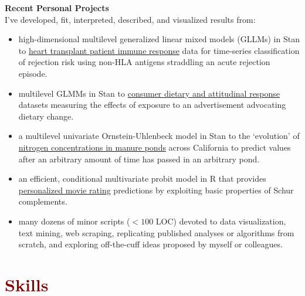 \documentclass[11pt,margin,line]{resume}
\begin{document}
\begin{resume}
\textbf{Recent Personal Projects}\\
I've developed, fit, interpreted, described, and visualized results from:
\begin{itemize}[noitemsep]
\item high-dimensional multilevel generalized linear mixed models (GLLMs) in Stan to \ul{heart transplant patient immune response} data for time-series classification of rejection risk using non-HLA antigens straddling an acute rejection episode.
\item multilevel GLMMs in Stan to \ul{consumer dietary and attitudinal response} datasets measuring the effects of exposure to an advertisement advocating dietary change.
\item a multilevel univariate Ornstein-Uhlenbeck model in Stan to the `evolution' of \ul{nitrogen concentrations in manure ponds} across California to predict values after an arbitrary amount of time has passed in an arbitrary pond.
\item an efficient, conditional multivariate probit model in R that provides \ul{personalized movie rating} predictions by exploiting basic properties of Schur complements.
\item many dozens of minor scripts ($<100$ LOC) devoted to data visualization, text mining, web scraping, replicating published analyses or algorithms from scratch, and exploring off-the-cuff ideas proposed by myself or colleagues.
\end{itemize}
\vspace{-1.5mm}

\section{\large\textcolor{DarkRed}{Skills}}

\begin{comment}
\textbf{Technical}: Generalized Linear Regression Analysis (e.g. Gaussian process, spline, poisson, logistic, robust, probit), PCA, Missing Data Imputation / Marginalization, Measurement Error Modeling, Stochastic Processes (e.g. CTMC / DTMC, birth-death, multivariate diffusion), Random Forests, Support Vector Machines, Neural Networks, Natural Language Processing, Expectation-Maximization, Model comparison (e.g. x-validation, information theoretic, marginal likelihood-based methods), Monte Carlo Methods, Clustering, Parallel \& Distributed Computing

\textbf{Other}: Science Communication, Teaching, Project Management, Hitchhiking, Public Speaking, Backpacking, Data Visualization, Googling, Computer Assembly \& Repair, Universal Design, Photography, Image Editing 
\end{comment}


\end{resume}
\end{document}
